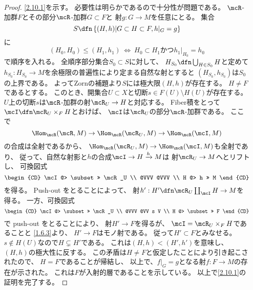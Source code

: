 \documentclass[uplatex,dvipdfmx]{jsarticle}
\begin{document}
\begin{proof}
  \ref{2.10.1}を示す。
  必要性は明らかであるので十分性が問題である。
  \(\mcR\)-加群\(F\)とその部分\(\mcR\)-加群\(G\subset F\)と
  射\(g:G\to M\)を任意にとる。
  集合
  \[
  S\dfn \left\{ (H,h)\middle| G\subset H\subset F, h|_G=g\right\}
  \]
  に
  \[(H_0,H_0) \leq (H_1,h_1) \ \iff \ H_0\subset H_1 \text{かつ} h_1|_{H_0}=h_0\]
  で順序を入れる。
  全順序部分集合\(S_0\subset S\)に対して、
  \(H_{S_0}\dfn \bigcup_{H\in S_0}H\)と定めて
  \(h_{S_0}:H_{S_0}\to M\)を余極限の普遍性により定まる自然な射とすると
  \((H_{S_0},h_{S_0})\)は\(S_0\)の上界である。
  よってZornの補題より\(S\)には極大限\((H,h)\)が存在する。
  \(H\neq F\)であるとする。
  このとき、開集合\(U\subset X\)と切断\(s\in F(U)\setminus H(U)\)が存在する。
  \(U\)上の切断\(s\)は\(\mcR\)-加群の射\(\mcR_U\to H\)と対応する。
  Fiber積をとって\(\mcI\dfn \mcR_U\times_FH\)とおけば、
  \(\mcI\)は\(\mcR_U\)の部分\(\mcR\)-加群である。
  ここで
  \[
  \Hom_{\mcR}(\mcR,M)\to \Hom_{\mcR}(\mcR_U,M)\to \Hom_{\mcR}(\mcI,M)
  \]
  の合成は全射であるから、
  \(\Hom_{\mcR}(\mcR_U,M)\to \Hom_{\mcR}(\mcI,M)\)も全射であり、
  従って、自然な射影と\(h\)の合成\(\mcI\to H\xrightarrow{h}M\)は
  射\(\mcR_U\to M\)へとリフトし、
  可換図式
  \[
  \begin{CD}
    \mcI @> \subset >> \mcR_U \\
    @VVV @VVV \\
    H @> h >> M
  \end{CD}
  \]
  を得る。
  Push-out をとることによって、
  射\(h':H'\dfn \mcR_U\coprod_{\mcI}H \to M\)を得る。
  一方、可換図式
  \[
  \begin{CD}
    \mcI @> \subset >> \mcR_U \\
    @VVV @VV s V \\
    H @> \subset >> F
  \end{CD}
  \]
  で push-out をとることにより、
  射\(H' \to F\)を得るが、
  \(\mcI=\mcR_U\times_F H\)であることと
  \autoref{1.6.3}より、
  \(H'\to F\)はモノ射である。
  従って\(H'\subset F\)とみなせる。
  \(s\not\in H(U)\)なので\(H\subsetneq H'\)である。
  これは\((H,h) < (H',h')\)を意味し、\((H,h)\)の極大性に反する。
  この矛盾は\(H\neq F\)と仮定したことにより引き起こされたので、
  \(H=F\)であることが帰結し、
  以上で、\(f|_G=g\)となる射\(f:F\to M\)の存在が示された。
  これは\(F\)が入射的層であることを示している。
  以上で\ref{2.10.1}の証明を完了する。


\end{proof}
\end{document}
